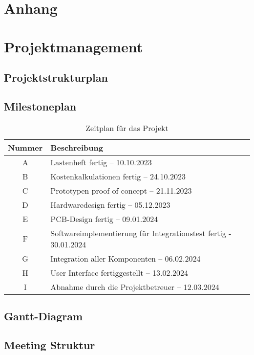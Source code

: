 \documentclass[titlepage,12pt,twoside]{article}
\begin{document}
\section{Anhang}
\section{Projektmanagement}
\subsection{Projektstrukturplan}
\subsection{Milestoneplan}
\begin{table}[h]
    \centering
    \begin{tabular}{|c|l|}  %
        \hline
        \textbf{Nummer} & \textbf{Beschreibung} \\
        \hline
        A & Lastenheft fertig – 10.10.2023 \\
        B & Kostenkalkulationen fertig – 24.10.2023 \\
        C & Prototypen proof of concept – 21.11.2023 \\
        D & Hardwaredesign fertig – 05.12.2023 \\
        E & PCB-Design fertig – 09.01.2024 \\
        F & Softwareimplementierung für Integrationstest fertig - 30.01.2024 \\
        G & Integration aller Komponenten – 06.02.2024 \\
        H & User Interface fertiggestellt – 13.02.2024 \\
        I & Abnahme durch die Projektbetreuer – 12.03.2024 \\
        \hline
    \end{tabular}
    \caption{Zeitplan für das Projekt}
    \label{tab:projektzeitplan}
\end{table}

\subsection{Gantt-Diagram}
\subsection{Meeting Struktur}
\end{document}
